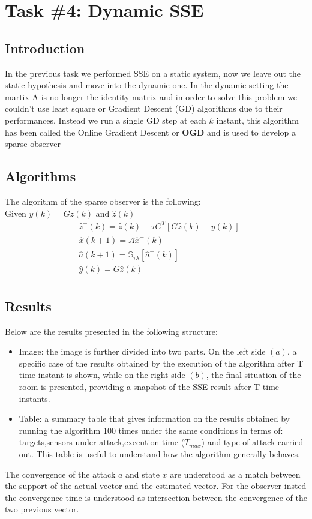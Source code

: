 \section*{Task \#4: Dynamic SSE}
    \subsection*{Introduction}
    In the previous task we performed SSE on a static system, now we leave out the static hypothesis and move into the dynamic one.
    In the dynamic setting the martix A is no longer the identity matrix and in order to solve this problem we couldn't use least square or Gradient Descent (GD) algorithms due to their performances. Instead we run a single GD step at each $k$ instant, this algorithm has been called the Online Gradient Descent or \textbf{OGD} and is used to develop a sparse observer
    
    \subsection*{Algorithms}
    The algorithm of the sparse observer is the following:
    \\Given $y(k) = Gz(k)$ and $\hat{z}(k)$
    \begin{equation} \label{eq:OGD}
        \begin{aligned}
            &\hat{z}^+(k) = \hat{z}(k) - \tau G^T[G\hat{z}(k) - y(k)]\\
            &\hat{x}(k+1) = A\hat{x}^+(k)\\
            &\hat{a}(k+1) = \mathbb{S}_{\tau \lambda}[\hat{a}^+(k)]\\
            &\hat{y}(k) = G \hat{z}(k)\\
        \end{aligned}    
    \end{equation}   
    
    \subsection*{Results}
    Below are the results presented in the following structure:
    \begin{itemize}
        \item Image: the image is further divided into two parts. On the left side $(a)$, a specific case of the results obtained by the execution of the algorithm after T time instant is shown, while on the right side $(b)$, the final situation of the room is presented, providing a snapshot of the SSE result after T time instants.
        \item Table: a summary table that gives information on the results obtained by running the algorithm 100 times under the same conditions in terms of: targets,sensors under attack,execution time ($T_{max}$) and type of attack carried out. This table is useful to understand how the algorithm generally behaves.
    \end{itemize}
\noindent
    The convergence of the attack $a$ and state $x$ are understood as a match between the support of the actual vector and the estimated vector. For the observer insted the convergence time is understood as intersection between the convergence of the two previous vector.
